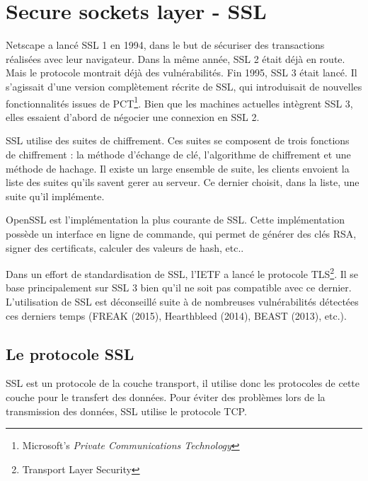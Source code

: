 \section{Secure sockets layer - SSL}
Netscape a lancé SSL 1 en 1994, dans le but de sécuriser des transactions réalisées avec leur navigateur. 
Dans la même année, SSL 2 était déjà en route. 
Mais le protocole montrait déjà des vulnérabilités.
Fin 1995, SSL 3 était lancé. 
Il s'agissait d'une version complètement récrite de SSL, qui introduisait de nouvelles fonctionnalités issues de PCT\footnote{Microsoft's \textit{Private Communications Technology}}.
Bien que les machines actuelles intègrent SSL 3, elles essaient d'abord de négocier une connexion en SSL 2.

SSL utilise des suites de chiffrement. 
Ces suites se composent de trois fonctions de chiffrement : la méthode d'échange de clé, l'algorithme de chiffrement et une méthode de hachage. 
Il existe un large ensemble de suite, les clients envoient la liste des suites qu'ils savent gerer au serveur. 
Ce dernier choisit, dans la liste, une suite qu'il implémente. 

OpenSSL est l'implémentation la plus courante de SSL. 
Cette implémentation possède un interface en ligne de commande, qui permet de générer des clés RSA, signer des certificats, calculer des valeurs de hash, etc..

Dans un effort de standardisation de SSL, l'IETF a lancé le protocole TLS\footnote{Transport Layer Security}.
Il se base principalement sur SSL 3 bien qu'il ne soit pas compatible avec ce dernier.
L'utilisation de SSL est déconseillé suite à de nombreuses vulnérabilités détectées ces derniers temps (FREAK (2015), Hearthbleed (2014), BEAST (2013), etc.).

\subsection{Le protocole SSL}
SSL est un protocole de la couche transport, il utilise donc les protocoles de cette couche pour le transfert des données. 
Pour éviter des problèmes lors de la transmission des données, SSL utilise le protocole TCP.

